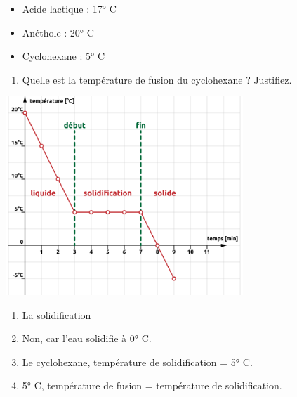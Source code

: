 \documentclass[
  11pt,
  french,
  a4paper,
  openany]{book}
\providecommand{\tightlist}{%
  \setlength{\itemsep}{0pt}\setlength{\parskip}{0pt}}
\begin{document}
\begin{Exercise}
\begin{itemize}
\tightlist
\item
  Acide lactique : 17° C
\item
  Anéthole : 20° C
\item
  Cyclohexane : 5° C
\end{itemize}

\begin{enumerate}
\def\labelenumi{\arabic{enumi}.}
\setcounter{enumi}{5}
\tightlist
\item
  Quelle est la température de fusion du cyclohexane ? Justifiez.\\
\end{enumerate}


\end{Exercise}

\begin{Answer}

\begin{center}
\includegraphics[width=0.67\textwidth,height=\textheight]{images/graph-cyclohexane-corr.png}

\end{center}

\begin{enumerate}
\def\labelenumi{\arabic{enumi}.}
\setcounter{enumi}{1}
\tightlist
\item
  La solidification
\item
  Non, car l'eau solidifie à 0° C.
\item
  Le cyclohexane, température de solidification = 5° C.
\item
  5° C, température de fusion = température de solidification.
\end{enumerate}


\end{Answer}
\end{document}
